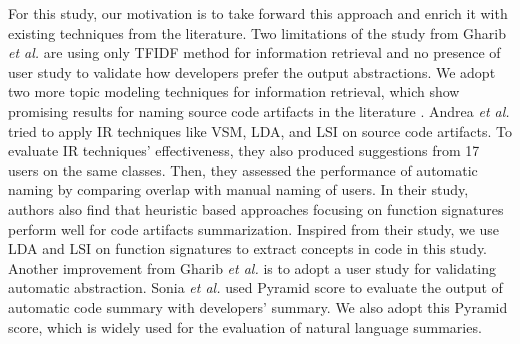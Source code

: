 For this study, our motivation is to take forward this approach and enrich it with existing techniques from the literature. Two limitations of the study from Gharib \textit{et al.}  are using only TFIDF method for information retrieval and no presence of user study to validate how developers prefer the output abstractions. We adopt two more topic modeling techniques for information retrieval, which show promising results for naming source code artifacts in the literature \cite{de2012IRMethodsArtifacts}. Andrea \textit{et al.}  \cite{de2012IRMethodsArtifacts} tried to apply IR techniques like VSM, LDA, and LSI on  source code artifacts. To evaluate IR techniques' effectiveness, they also produced suggestions from 17 users on the same classes. Then, they assessed the performance of automatic naming by comparing overlap
with manual naming of users. In their study, authors also find that heuristic based approaches focusing on function signatures perform well for code artifacts summarization. Inspired from their study, we use LDA and LSI on function signatures to extract concepts in code in this study. Another improvement from Gharib \textit{et al.} is to adopt a user study for validating automatic abstraction. Sonia \textit{et al.}  \cite{haiduc2010supporting} used Pyramid score to evaluate the output of automatic code summary with developers' summary. We also adopt this Pyramid score, which is widely used for the evaluation of natural language summaries.






